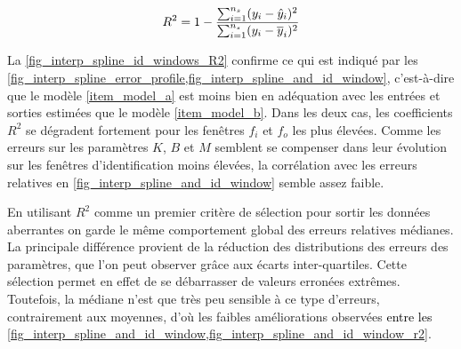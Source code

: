 \begin{equation} \label{eq_coef_determination}
R^2 = 1 - \frac{\sum_{i=1}^{n_s}(y_i-\hat{y}_i)^2}{\sum_{i=1}^{n_s}(y_i-\overline{y}_i)^2}
\end{equation}

%


La \cref{fig_interp_spline_id_windows_R2} confirme ce qui est indiqué par les \cref{fig_interp_spline_error_profile,fig_interp_spline_and_id_window}, c'est-à-dire que le modèle \cref{item_model_a} est moins bien en adéquation avec les entrées et sorties estimées que le modèle \cref{item_model_b}. Dans les deux cas, les coefficients $R^2$ se dégradent fortement pour les fenêtres $f_i$ et $f_o$ les plus élevées. Comme les erreurs sur les paramètres $K$, $B$ et $M$ semblent se compenser dans leur évolution sur les fenêtres d'identification moins élevées, la corrélation avec les erreurs relatives en \cref{fig_interp_spline_and_id_window} semble assez faible.


En utilisant $R^2$ comme un premier critère de sélection pour sortir les données aberrantes on garde le même comportement global des erreurs relatives médianes. La principale différence provient de la réduction des distributions des erreurs des paramètres, que l'on peut observer grâce aux écarts inter-quartiles. Cette sélection permet en effet de se débarrasser de valeurs erronées extrêmes. Toutefois, la médiane n'est que très peu sensible à ce type d'erreurs, contrairement aux moyennes, d'où les faibles améliorations observées \textcolor{black}{entre les \cref{fig_interp_spline_and_id_window,fig_interp_spline_and_id_window_r2}}.



